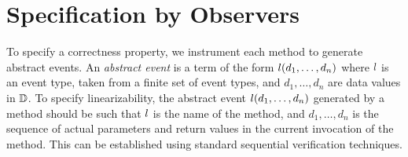 
\section{Specification by Observers}
\label{sec:observers}
To specify a correctness property,
we  instrument each method to generate abstract events. 
An {\em abstract event} is a term of the form $l(d_1, \ldots , d_n)$
where $l$ is an event type, taken from a finite set of event types,
and  $d_1, \ldots , d_n$ are data values in $\mathbb{D}$.
To specify linearizability, the abstract event $l(d_1, \ldots , d_n)$
generated by a method should be such that $l$ is the name of the
method, and $d_1, \ldots , d_n$ is the sequence of actual parameters and
return values in the current invocation of the method.
This can be established using standard sequential verification techniques.

